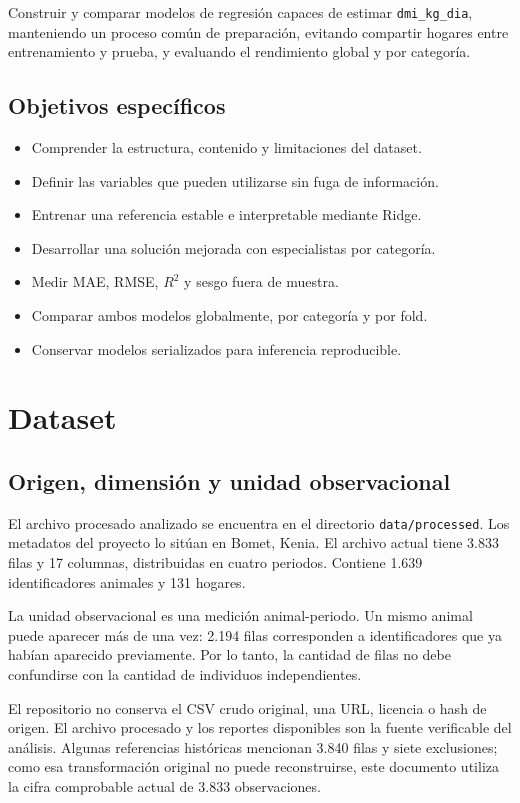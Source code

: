 \documentclass[11pt,a4paper]{article}
\newcommand{\codigo}[1]{\nolinkurl{#1}}
\begin{document}
Construir y comparar modelos de regresión capaces de estimar \codigo{dmi_kg_dia}, manteniendo un proceso común de preparación, evitando compartir hogares entre entrenamiento y prueba, y evaluando el rendimiento global y por categoría.

\subsection{Objetivos específicos}
\begin{itemize}
  \item Comprender la estructura, contenido y limitaciones del dataset.
  \item Definir las variables que pueden utilizarse sin fuga de información.
  \item Entrenar una referencia estable e interpretable mediante Ridge.
  \item Desarrollar una solución mejorada con especialistas por categoría.
  \item Medir MAE, RMSE, $R^2$ y sesgo fuera de muestra.
  \item Comparar ambos modelos globalmente, por categoría y por fold.
  \item Conservar modelos serializados para inferencia reproducible.
\end{itemize}

\section{Dataset}

\subsection{Origen, dimensión y unidad observacional}

El archivo procesado analizado se encuentra en el directorio \codigo{data/processed}. Los metadatos del proyecto lo sitúan en Bomet, Kenia. El archivo actual tiene 3.833 filas y 17 columnas, distribuidas en cuatro periodos. Contiene 1.639 identificadores animales y 131 hogares.

La unidad observacional es una medición animal-periodo. Un mismo animal puede aparecer más de una vez: 2.194 filas corresponden a identificadores que ya habían aparecido previamente. Por lo tanto, la cantidad de filas no debe confundirse con la cantidad de individuos independientes.

El repositorio no conserva el CSV crudo original, una URL, licencia o hash de origen. El archivo procesado y los reportes disponibles son la fuente verificable del análisis. Algunas referencias históricas mencionan 3.840 filas y siete exclusiones; como esa transformación original no puede reconstruirse, este documento utiliza la cifra comprobable actual de 3.833 observaciones.
\end{document}
